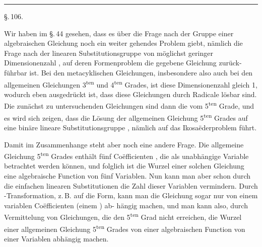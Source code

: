 
\begin{center}

\medskip
{}

\medskip
\rule{0.3\linewidth}{0.4pt}

\medskip
\S.\,106.

\end{center}

Wir haben im \S.\,44 gesehen, dass es \"uber die Frage nach
der  Gruppe einer algebraischen Gleichung noch
ein weiter gehendes Problem giebt, n\"amlich die Frage nach der
linearen Substitutionsgruppe von m\"oglichst geringer Dimensionenzahl
, auf deren Formenproblem die gegebene Gleichung zur\"uck-
f\"uhrbar ist. Bei den metacyklischen Gleichungen, insbesondere
also auch bei den allgemeinen Gleichungen 3\textsuperscript{ten} und 4\textsuperscript{ten} Grades,
ist diese Dimensionenzahl gleich 1, wodurch eben ausgedr\"uckt
ist, dass diese Gleichungen durch Radicale l\"osbar sind. Die
zun\"achst zu untersuchenden Gleichungen sind dann die vom
5\textsuperscript{ten} Grade, und es wird sich zeigen, dass die L\"osung der allgemeinen
 Gleichung 5\textsuperscript{ten} Grades auf eine bin\"are lineare Substitutionsgruppe
, n\"amlich auf das Ikosa\"ederproblem f\"uhrt.

Damit im Zusammenhange steht aber noch eine andere Frage.
Die allgemeine Gleichung 5\textsuperscript{ten} Grades enth\"alt f\"unf Co\"efficienten
, die als unabh\"angige Variable betrachtet werden k\"onnen,
und folglich ist die Wurzel einer solchen Gleichung eine algebraische
 Function von f\"unf Variablen. Nun kann man aber
schon durch die einfachen linearen Substitutionen die Zahl dieser
Variablen vermindern. Durch -Transformation,
z.\,B. auf die  Form, kann man die Gleichung sogar
nur von einem variablen Co\"efficienten (einem ) ab-
h\"angig machen, und man kann also, durch Vermittelung von
Gleichungen, die den 5\textsuperscript{ten} Grad nicht erreichen, die Wurzel einer
allgemeinen Gleichung 5\textsuperscript{ten} Grades von einer algebraischen
Function von einer Variablen abh\"angig machen.
